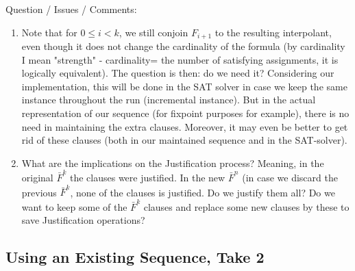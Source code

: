 \documentclass{article}
\begin{document}
Question / Issues / Comments:
\begin{enumerate}
	\item Note that for $0\leq i < k$, we still conjoin $F_{i+1}$ to the resulting interpolant, even though it does not change the cardinality of the formula (by cardinality I mean "strength" - cardinality= the number of satisfying assignments, it is logically equivalent). The question is then: do we need it? Considering our implementation, this will be done in the SAT solver in case we keep the same instance throughout the run (incremental instance). But in the actual representation of our sequence (for fixpoint purposes for example), there is no need in maintaining the extra clauses. Moreover, it may even be better to get rid of these clauses (both in our maintained sequence and in the SAT-solver).

	\item What are the implications on the Justification process? Meaning, in the original $\bar{F}^k$ the clauses were justified. In the new $\bar{F}^n$ (in case we discard the previous $\bar{F}^k$, none of the clauses is justified. Do we justify them all? Do we want to keep some of the $\bar{F}^k$ clauses and replace some new clauses by these to save Justification operations?
\end{enumerate}

\subsection{Using an Existing Sequence, Take 2}
\end{document}
